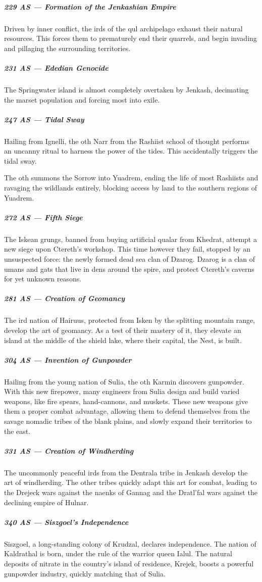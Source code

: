 \subparagraph{229 AS --- Formation of the Jenkashian Empire} Driven by inner conflict, the irds of the qul archipelago exhaust their natural resources.
This forces them to prematurely end their quarrels, and begin invading and pillaging the surrounding territories.

\subparagraph{231 AS --- Ededian Genocide} The Springwater island is almost completely overtaken by Jenkash, decimating the marset population and forcing most into exile.

\subparagraph{247 AS --- Tidal Sway} Hailing from Ignelli, the oth Narr from the Rashiist school of thought performs an uncanny ritual to harness the power of the tides.
This accidentally triggers the tidal sway.

The oth summons the Sorrow into Yuadrem, ending the life of most Rashiists and ravaging the wildlands entirely, blocking access by land to the southern regions of Yuadrem.

\subparagraph{272 AS --- Fifth Siege} The Iskean grungs, banned from buying artificial qualar from Khedrat, attempt a new siege upon Ctereth's workshop.
This time however they fail, stopped by an unsuspected force: the newly formed dead sea clan of Dzarog.
Dzarog is a clan of umans and gats that live in dens around the spire, and protect Ctereth's caverns for yet unknown reasons.

\subparagraph{281 AS --- Creation of Geomancy} The ird nation of Hairuus, protected from Isken by the splitting mountain range, develop the art of geomancy.
As a test of their mastery of it, they elevate an island at the middle of the shield lake, where their capital, the Nest, is built.

\subparagraph{304 AS --- Invention of Gunpowder} Hailing from the young nation of Sulia, the oth Karmin discovers gunpowder.
With this new firepower, many engineers from Sulia design and build varied weapons, like fire spears, hand-cannons, and muskets.
These new weapons give them a proper combat advantage, allowing them to defend themselves from the savage nomadic tribes of the blank plains, and slowly expand their territories to the east.

\subparagraph{331 AS --- Creation of Windherding} The uncommonly peaceful irds from the Dentrala tribe in Jenkash develop the art of windherding.
The other tribes quickly adapt this art for combat, leading to the Drejeck wars against the naenks of Gannag and the Dratl'fal wars against the declining empire of Hulnar.

\subparagraph{340 AS --- Siszgoel's Independence} Siszgoel, a long-standing colony of Krudzal, declares independence.
The nation of Kaldrathal is born, under the rule of the warrior queen Ialul.
The natural deposits of nitrate in the country's island of residence, Krejek, boosts a powerful gunpowder industry, quickly matching that of Sulia.

